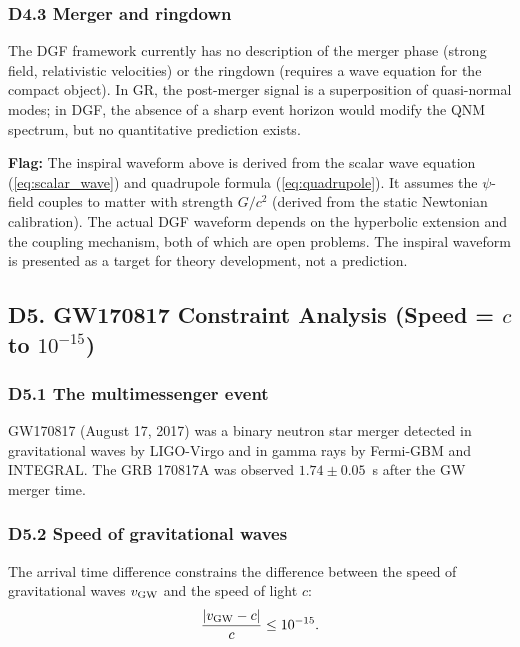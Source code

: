 \documentclass[reprint]{revtex4-2}
\begin{document}
\subsubsection{D4.3 Merger and ringdown}

The DGF framework currently has no description of the merger phase (strong field, relativistic velocities) or the ringdown (requires a wave equation for the compact object). In GR, the post-merger signal is a superposition of quasi-normal modes; in DGF, the absence of a sharp event horizon would modify the QNM spectrum, but no quantitative prediction exists.

\textbf{Flag:} The inspiral waveform above is derived from the scalar wave equation (\ref{eq:scalar_wave}) and quadrupole formula (\ref{eq:quadrupole}). It assumes the $\psi$-field couples to matter with strength $G/c^2$ (derived from the static Newtonian calibration). The actual DGF waveform depends on the hyperbolic extension and the coupling mechanism, both of which are open problems. The inspiral waveform is presented as a target for theory development, not a prediction.

\subsection{D5. GW170817 Constraint Analysis (Speed = $c$ to $10^{-15}$)}

\subsubsection{D5.1 The multimessenger event}

GW170817 (August 17, 2017) was a binary neutron star merger detected in gravitational waves by LIGO-Virgo and in gamma rays by Fermi-GBM and INTEGRAL. The GRB 170817A was observed $1.74 \pm 0.05$~s after the GW merger time.

\subsubsection{D5.2 Speed of gravitational waves}

The arrival time difference constrains the difference between the speed of gravitational waves $v_{\rm GW}$ and the speed of light $c$:
\begin{equation}
\frac{|v_{\rm GW} - c|}{c} \le 10^{-15}.
\end{equation}
\end{document}
